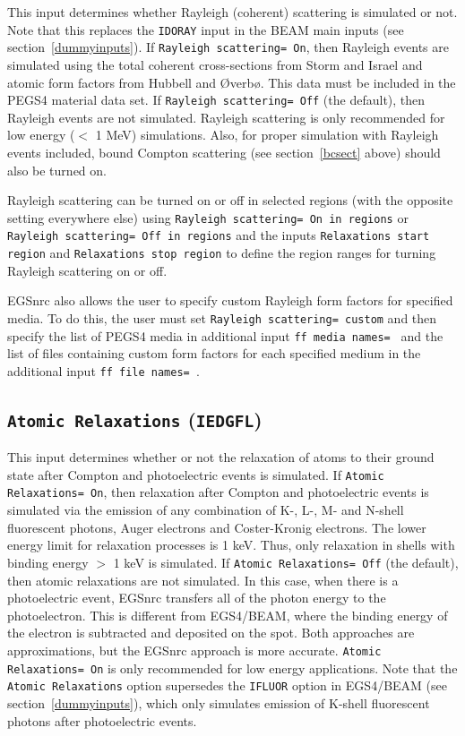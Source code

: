 \documentclass[12pt,twoside]{article}
\begin{document}
This input determines whether Rayleigh (coherent) scattering is
simulated or not.  Note that this replaces the {\tt IDORAY} input
in the BEAM main inputs (see section~\ref{dummyinputs}).
If {\tt Rayleigh scattering= On}, then Rayleigh events are simulated
using the total coherent cross-sections from Storm and
Israel\cite{SI70} and atomic form factors from Hubbell and {\O}verb{\o}\cite{HO79}.
This data must be included in the PEGS4 material data set.
If {\tt Rayleigh scattering= Off} (the default), then Rayleigh
events are not simulated.  Rayleigh scattering is only recommended for
low energy ($<$ 1 MeV) simulations.  Also, for proper simulation
with Rayleigh events included, bound Compton scattering (see section~\ref{bcsect} above)
should also be turned on.

Rayleigh scattering can be turned on or off in selected regions
(with the opposite setting everywhere else) using
{\tt Rayleigh scattering= On in regions} or {\tt Rayleigh scattering= Off
in regions} and the inputs
{\tt Relaxations start region} and {\tt Relaxations stop region} to
define the region ranges for turning Rayleigh scattering on or off.

EGSnrc also allows the user to specify custom Rayleigh form factors for
specified media.  To do this, the user must
set {\tt Rayleigh scattering= custom} and then specify the list of
PEGS4 media in additional input {\tt ff media names= } and the list of
files containing custom form factors for each specified
medium in the additional input {\tt ff file names= }.

\subsection{ {\tt Atomic Relaxations} ({\tt IEDGFL})}

This input determines whether or not the relaxation of atoms to their
ground state after Compton and photoelectric events is simulated.
If {\tt Atomic Relaxations= On}, then relaxation after
Compton and photoelectric events is simulated via the
emission of any combination of K-, L-, M- and N-shell fluorescent photons, Auger electrons
and Coster-Kronig electrons.  The lower energy limit for relaxation processes
is 1 keV.  Thus, only relaxation in shells with binding energy $>$ 1 keV is
simulated.
If {\tt Atomic Relaxations= Off} (the default), then atomic relaxations
are not simulated.  In this case, when there is a
photoelectric event, EGSnrc transfers all of the photon energy to the
photoelectron.  This is different from EGS4/BEAM, where the binding energy
of the electron is subtracted and deposited on the spot.  Both approaches
are approximations, but the EGSnrc approach is more accurate.
{\tt Atomic Relaxations= On} is only recommended for low energy applications.
Note that
the {\tt Atomic Relaxations} option supersedes the {\tt IFLUOR} option
in EGS4/BEAM (see section~\ref{dummyinputs}), which only simulates
emission of
K-shell fluorescent photons after photoelectric events.
\end{document}
